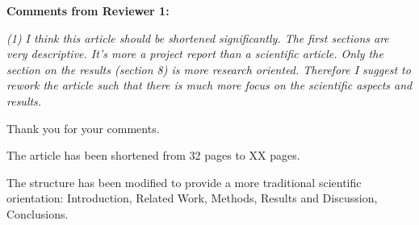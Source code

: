 \documentclass[12pt]{letter}
\begin{document}
\begin{letter}{}

{\bf Comments from Reviewer 1:}

{\em (1) I think this article should be shortened significantly. The first sections are very descriptive. It's more a project report than a scientific article. Only the section on the results (section 8) is more research oriented. Therefore I suggest to rework the article such that there is much more focus on the scientific aspects and results.}

Thank you for your comments.

The article has been shortened from 32 pages to XX pages.

The structure has been modified to provide a more traditional scientific orientation: Introduction, Related Work, Methods, Results and Discussion, Conclusions.


\end{letter}
\end{document}
